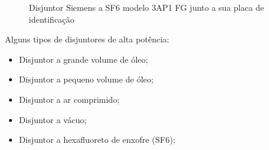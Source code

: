 \documentclass[a5paper,english,spanish,brazil]{ufsc-thesis}
\begin{document}
\begin{figure}[htb]
  \caption{Disjuntor Siemens a SF6 modelo 3AP1 FG junto a sua placa de identificação}
  \centering
\end{figure}\par

Alguns tipos de disjuntores de alta potência:\par
\begin{itemize}
\item Disjuntor a grande volume de óleo;
\item Disjuntor a pequeno volume de óleo;
\item Disjuntor a ar comprimido;
\item Disjuntor a vácuo;
\item Disjuntor a hexafluoreto de enxofre (SF6); 
\end{itemize}
\end{document}
